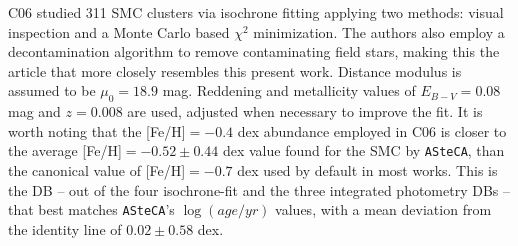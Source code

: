 \documentclass{aa}
\begin{document}
%
C06 studied 311 SMC clusters via isochrone fitting applying two methods: visual
inspection and a Monte Carlo based $\chi^2$ minimization. The authors also
employ a decontamination algorithm to remove contaminating field stars, making
this the article that more closely resembles this present work.
Distance modulus is assumed to be $\mu_0{=}18.9$ mag. Reddening and
metallicity values of $E_{B-V}{=}0.08$ mag and $z{=}0.008$ are used, adjusted
when necessary to improve the fit.
It is worth noting that the [Fe/H]${=}-0.4$ dex abundance employed in
C06 is closer to the average [Fe/H]${=}-0.52{\pm}0.44$ dex value found for the
SMC by \texttt{ASteCA}, than the canonical value of [Fe/H]${=}-0.7$ dex used by
default in most works.
This is the DB -- out of the four isochrone-fit and the three integrated
photometry DBs -- that best matches \texttt{ASteCA}'s $\log(age/yr)$ values,
with a mean deviation from the identity line of $0.02\pm0.58$ dex.

%
\end{document}
